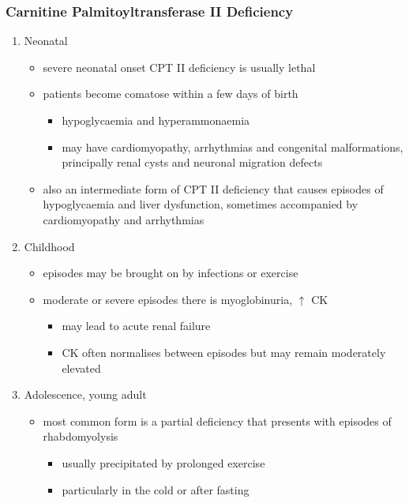 \documentclass{scrartcl}
\begin{document}
\subsubsection{Carnitine Palmitoyltransferase II Deficiency}
\label{sec:org8df1d36}
\begin{enumerate}
\item Neonatal
\label{sec:org4d3e7a0}
\begin{itemize}
\item severe neonatal onset CPT II deficiency is usually lethal
\item patients become comatose within a few days of birth
\begin{itemize}
\item hypoglycaemia and hyperammonaemia
\item may have cardiomyopathy, arrhythmias and congenital malformations,
principally renal cysts and neuronal migration defects
\end{itemize}
\item also an intermediate form of CPT II deficiency that causes
episodes of hypoglycaemia and liver dysfunction, sometimes
accompanied by cardiomyopathy and arrhythmias
\end{itemize}

\item Childhood
\label{sec:org1583c17}
\begin{itemize}
\item episodes may be brought on by infections or exercise
\item moderate or severe episodes there is myoglobinuria, \(\uparrow\) CK
\begin{itemize}
\item may lead to acute renal failure
\item CK often normalises between episodes but may remain moderately
elevated
\end{itemize}
\end{itemize}

\item Adolescence,  young adult
\label{sec:org772b864}
\begin{itemize}
\item most common form is a partial deficiency that presents with
episodes of rhabdomyolysis
\begin{itemize}
\item usually precipitated by prolonged exercise
\item particularly in the cold or after fasting
\end{itemize}
\end{itemize}
\end{enumerate}
\end{document}
